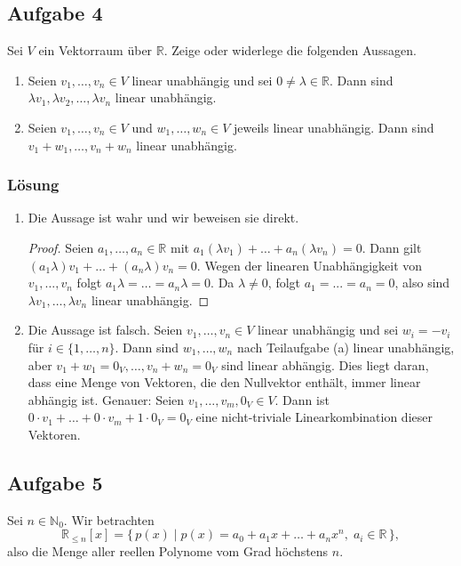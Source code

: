 \documentclass[a4paper,10pt]{article}
\newcommand{\N}{\mathbb{N}}
\newcommand{\R}{\mathbb{R}}
\newcommand{\s}[1]{#1}
\begin{document}
\subsection*{Aufgabe 4}
Sei $V$ ein Vektorraum über $\R$. Zeige oder widerlege die folgenden Aussagen. 
\begin{enumerate}[label=(\alph*)]
\item Seien $v_1,\dots,v_n \in V$ linear unabhängig und sei $0\neq \lambda \in \R$. 
Dann sind $\lambda v_1,\lambda v_2,\dots,\lambda v_n$ linear unabhängig.
\item Seien $v_1,\dots,v_n \in V$ und $w_1,\dots,w_n \in V$ jeweils linear unabhängig. 
Dann sind $v_1+w_1,\dots,v_n+w_n$ linear unabhängig.
\end{enumerate}
\s{\subsubsection*{Lösung}
\begin{enumerate}[label=(\alph*)]
\item Die Aussage ist wahr und wir beweisen sie direkt.
\begin{proof}
Seien $a_1,\dots,a_n \in \R$ mit $a_1(\lambda v_1)+\dots+a_n(\lambda v_n)=0$.  
Dann gilt $(a_1\lambda)v_1+\dots+(a_n\lambda)v_n=0$. Wegen der linearen Unabhängigkeit von $v_1,\dots,v_n$ folgt $a_1\lambda=\dots=a_n\lambda=0$. Da $\lambda\neq 0$, folgt $a_1=...=a_n=0$, also sind $\lambda v_1,\dots,\lambda v_n$ linear unabhängig.
\end{proof}

\item Die Aussage ist falsch. Seien $v_1,\dots,v_n \in V$ linear unabhängig und sei $w_i=-v_i$ für $i\in\{1,\dots,n\}$.  
Dann sind $w_1,\dots,w_n$ nach Teilaufgabe (a) linear unabhängig, aber $v_1+w_1=0_V,\dots,v_n+w_n=0_V$ sind linear abhängig. Dies liegt daran, dass eine Menge von Vektoren, die den Nullvektor enthält, immer linear abhängig ist. Genauer: Seien $v_1,\dots,v_m,0_V\in V$. Dann ist $0\cdot v_1+\dots+0\cdot v_m+1\cdot 0_V=0_V$ eine nicht-triviale Linearkombination dieser Vektoren.
\end{enumerate}
}

\subsection*{Aufgabe 5}
Sei $n\in\N_0$. Wir betrachten
\[
\R_{\leq n}[x] = \{\, p(x) \mid p(x) = a_0 + a_1x + \dots + a_nx^n,\; a_i \in \R \,\},
\]
also die Menge aller reellen Polynome vom Grad höchstens $n$.  
\end{document}
